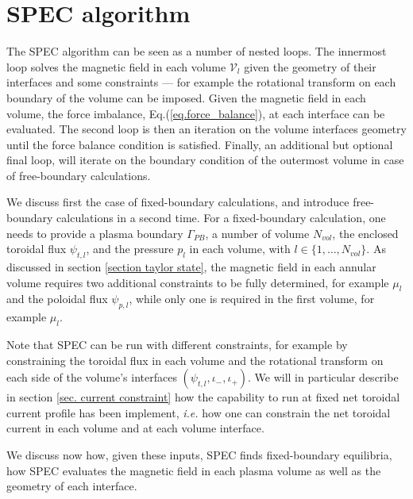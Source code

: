 \documentclass[my_thesis.tex]{subfiles}
\begin{document}
\section{SPEC algorithm \label{sec. spec_algorithm}} 
The SPEC algorithm can be seen as a number of nested loops. The innermost loop solves the magnetic field in each volume $\mathcal{V}_l$ given the geometry of their interfaces and some constraints --- for example the rotational transform on each boundary of the volume can be imposed. Given the magnetic field in each volume, the force imbalance, Eq.(\ref{eq.force_balance}), at each interface can be evaluated. The second loop is then an iteration on the volume interfaces geometry until the force balance condition is satisfied. Finally, an additional but optional final loop, will iterate on the boundary condition of the outermost volume in case of free-boundary calculations.

We discuss first the case of fixed-boundary calculations, and introduce free-boundary calculations in a second time. For a fixed-boundary calculation, one needs to provide a plasma boundary $\Gamma_{PB}$, a number of volume $N_{vol}$, the enclosed toroidal flux $\psi_{t,l}$, and the pressure $p_l$ in each volume, with $l\in\{1,\ldots,N_{vol}\}$. As discussed in section \ref{section taylor state}, the magnetic field in each annular volume requires two additional constraints to be fully determined, for example $\mu_l$ and the poloidal flux $\psi_{p,l}$, while only one is required in the first volume, for example $\mu_l$. 

Note that \ac{SPEC} can be run with different constraints, for example by constraining the toroidal flux in each volume and the rotational transform on each side of the volume's interfaces $(\psi_{t,l},\iota_-,\iota_+)$. We will in particular describe in section \ref{sec. current constraint} how the capability to run at fixed net toroidal current profile has been implement, \textit{i.e.} how one can constrain the net toroidal current in each volume and at each volume interface.

We discuss now how, given these inputs, SPEC finds fixed-boundary equilibria, how SPEC evaluates the magnetic field in each plasma volume as well as the geometry of each interface.
\end{document}
